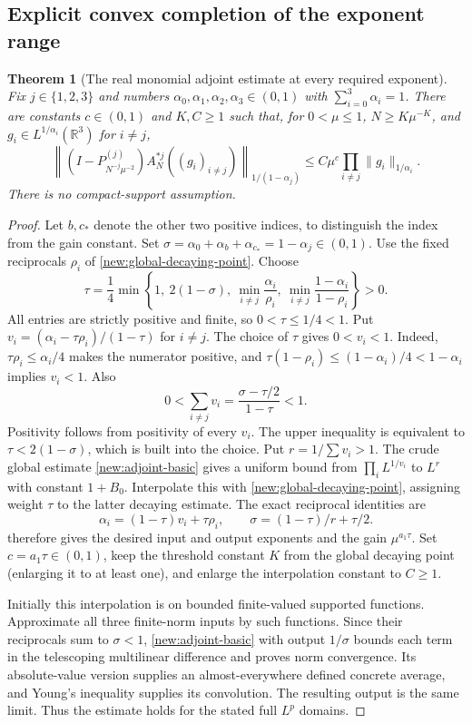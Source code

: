 \documentclass[11pt]{article}
\newtheorem{theorem}{Theorem}[section]
\theoremstyle{definition}
\newcommand{\R}{\mathbb R}
\begin{document}
\subsection{Explicit convex completion of the exponent range}
\begin{theorem}[The real monomial adjoint estimate at every required exponent]
\label{new:adjoint-all-exponents}
Fix $j\in\{1,2,3\}$ and numbers $\alpha_0,\alpha_1,\alpha_2,\alpha_3\in(0,1)$ with
$\sum_{i=0}^3\alpha_i=1$. There are constants $c\in(0,1)$ and $K,C\geq1$ such that, for
$0<\mu\leq1$, $N\geq K\mu^{-K}$, and $g_i\in L^{1/\alpha_i}(\R^3)$ for $i\ne j$,
\[
 \left\|(I-P_{N^{-j}\mu^{-2}}^{(j)})A_N^{*j}((g_i)_{i\ne j})\right\|_{1/(1-\alpha_j)}
 \leq C\mu^c\prod_{i\ne j}\|g_i\|_{1/\alpha_i}.
\]
There is no compact-support assumption.
\end{theorem}
\begin{proof}
Let $b,c_*$ denote the other two positive indices, to distinguish the index from the gain
constant. Set $\sigma=\alpha_0+\alpha_b+\alpha_{c_*}=1-\alpha_j\in(0,1)$.
Use the fixed reciprocals $\rho_i$ of \cref{new:global-decaying-point}. Choose
\[
 \tau=\frac14\min\left\{1,\ 2(1-\sigma),\
       \min_{i\ne j}\frac{\alpha_i}{\rho_i},\
       \min_{i\ne j}\frac{1-\alpha_i}{1-\rho_i}\right\}>0.
\]
All entries are strictly positive and finite, so $0<\tau\leq1/4<1$.
Put $v_i=(\alpha_i-\tau\rho_i)/(1-\tau)$ for $i\ne j$.
The choice of $\tau$ gives $0<v_i<1$. Indeed,
$\tau\rho_i\leq\alpha_i/4$ makes the numerator positive, and
$\tau(1-\rho_i)\leq(1-\alpha_i)/4<1-\alpha_i$ implies $v_i<1$.
Also
\[
 0<\sum_{i\ne j}v_i=\frac{\sigma-\tau/2}{1-\tau}<1.
\]
Positivity follows from positivity of every $v_i$. The upper inequality is equivalent to
$\tau<2(1-\sigma)$, which is built into the choice. Put $r=1/\sum v_i>1$.
The crude global estimate \cref{new:adjoint-basic} gives a uniform bound from
$\prod_i L^{1/v_i}$ to $L^r$ with constant $1+B_0$.
Interpolate this with \cref{new:global-decaying-point}, assigning weight $\tau$ to the
latter decaying estimate. The exact reciprocal identities are
\[
 \alpha_i=(1-\tau)v_i+\tau\rho_i,
 \qquad \sigma=(1-\tau)/r+\tau/2.
\]
 therefore gives the desired input and output exponents and the
gain $\mu^{a_1\tau}$. Set $c=a_1\tau\in(0,1)$, keep the threshold constant $K$ from the
global decaying point (enlarging it to at least one), and enlarge the interpolation constant
to $C\geq1$.

Initially this interpolation is on bounded finite-valued supported functions. Approximate
all three finite-norm inputs by such functions. Since their reciprocals sum to $\sigma<1$,
\cref{new:adjoint-basic} with output $1/\sigma$ bounds each term in the telescoping
multilinear difference and proves norm convergence. Its absolute-value version supplies
an almost-everywhere defined concrete average, and Young's inequality supplies its
convolution. The resulting output is the same limit. Thus the estimate holds for the
stated full $L^p$ domains.
\end{proof}
\end{document}
